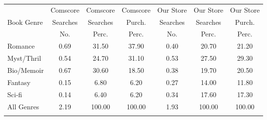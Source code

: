 \begin{center}
\begin{tabular}{lcccccc}
\hline \noalign{\smallskip} & Comscore & Comscore & Comscore & Our Store & Our Store & Our Store\\
Book Genre & Searches & Searches & Purch. & Searches & Searches & Purch.\\
 & No. & Perc. & Perc. & No. & Perc. & Perc.\\
\noalign{\smallskip}\hline \noalign{\smallskip}Romance & 0.69 & 31.50 & 37.90 & 0.40 & 20.70 & 21.20\\
Myst/Thril & 0.54 & 24.70 & 31.10 & 0.53 & 27.50 & 29.30\\
Bio/Memoir & 0.67 & 30.60 & 18.50 & 0.38 & 19.70 & 20.50\\
Fantasy & 0.15 & 6.80 & 6.20 & 0.27 & 14.00 & 11.80\\
Sci-fi & 0.14 & 6.40 & 6.20 & 0.34 & 17.60 & 17.30\\
All Genres & 2.19 & 100.00 & 100.00 & 1.93 & 100.00 & 100.00\\
\noalign{\smallskip}\hline\end{tabular}\\
\end{center}
